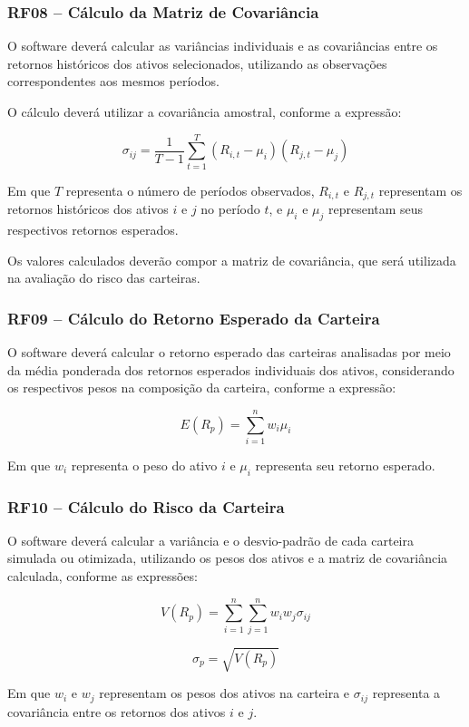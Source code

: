 \subsubsection{RF08 -- Cálculo da Matriz de Covariância}

O software deverá calcular as variâncias individuais e as covariâncias entre os retornos históricos dos ativos selecionados, utilizando as observações correspondentes aos mesmos períodos.

O cálculo deverá utilizar a covariância amostral, conforme a expressão:

\[
\sigma_{ij} =
\frac{1}{T-1}
\sum_{t=1}^{T}
(R_{i,t}-\mu_i)(R_{j,t}-\mu_j)
\]

Em que \(T\) representa o número de períodos observados, \(R_{i,t}\) e \(R_{j,t}\) representam os retornos históricos dos ativos \(i\) e \(j\) no período \(t\), e \(\mu_i\) e \(\mu_j\) representam seus respectivos retornos esperados.

Os valores calculados deverão compor a matriz de covariância, que será utilizada na avaliação do risco das carteiras.

\subsubsection{RF09 -- Cálculo do Retorno Esperado da Carteira}

O software deverá calcular o retorno esperado das carteiras
analisadas por meio da média ponderada dos retornos esperados
individuais dos ativos, considerando os respectivos pesos
na composição da carteira, conforme a expressão:

\[
E(R_p) = \sum_{i=1}^{n} w_i \mu_i
\]

Em que $w_i$ representa o peso do ativo $i$ e $\mu_i$
representa seu retorno esperado.

\subsubsection{RF10 -- Cálculo do Risco da Carteira}

O software deverá calcular a variância e o desvio-padrão
de cada carteira simulada ou otimizada, utilizando os pesos
dos ativos e a matriz de covariância calculada, conforme
as expressões:

\[
V(R_p) = \sum_{i=1}^{n}\sum_{j=1}^{n}
w_i w_j \sigma_{ij}
\]

\[
\sigma_p = \sqrt{V(R_p)}
\]

Em que $w_i$ e $w_j$ representam os pesos dos ativos na
carteira e $\sigma_{ij}$ representa a covariância entre
os retornos dos ativos $i$ e $j$.

